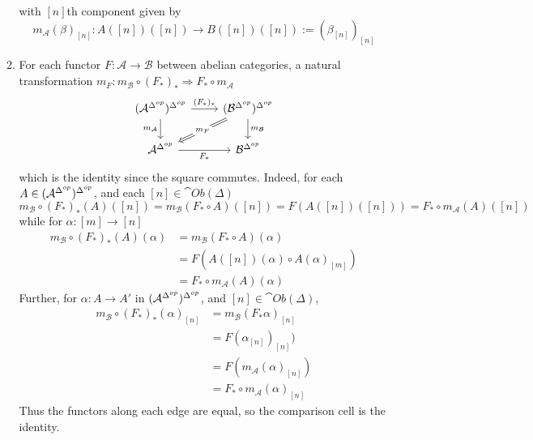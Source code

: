 \begin{enumerate}
\begin{enumerate}
\begin{equation*}
        \end{equation*}
        with $[n]$th component given by
        \begin{equation*}
            m_\mathcal{A}(\beta)_{[n]}:A([n])([n])\rightarrow B([n])([n]) := (\beta_{[n]})_{[n]}
        \end{equation*}
        \item For each functor $F:\mathcal{A}\rightarrow \mathcal{B}$ between abelian categories, a natural transformation $m_F:m_\mathcal{B}\circ (F_*)_*\Rightarrow F_*\circ m_\mathcal{A}$
        \[\begin{tikzcd}
        	{(\mathcal{A}\Sob)\Sob} & {(\mathcal{B}\Sob)\Sob} \\
        	{\mathcal{A}\Sob} & {\mathcal{B}\Sob}
        	\arrow["{(F_*)_*}", from=1-1, to=1-2]
        	\arrow["{m_\mathcal{B}}", from=1-2, to=2-2]
        	\arrow["{m_\mathcal{A}}"', from=1-1, to=2-1]
        	\arrow["{F_*}"', from=2-1, to=2-2]
        	\arrow["{m_F}"{description}, Rightarrow, from=1-2, to=2-1]
        \end{tikzcd}\]
        which is the identity since the square commutes. Indeed, for each $A \in (\mathcal{A}^{\Delta^{op}})^{\Delta^{op}}$, and each $[n] \in\cat{Ob}(\Delta)$
        \begin{equation*}
            m_\mathcal{B}\circ (F_*)_*(A)([n]) = m_\mathcal{B}(F_*\circ A)([n]) = F(A([n])([n])) = F_*\circ m_\mathcal{A}(A)([n])
        \end{equation*}
        while for $\alpha:[m]\rightarrow [n]$
        \begin{align*}
            m_\mathcal{B}\circ (F_*)_*(A)(\alpha) &= m_\mathcal{B}(F_*\circ A)(\alpha) \\
            &= F(A([n])(\alpha)\circ A(\alpha)_{[m]}) \\
            &= F_*\circ m_\mathcal{A}(A)(\alpha)
        \end{align*}
        Further, for $\alpha:A\rightarrow A'$ in $(\mathcal{A}^{\Delta^{op}})^{\Delta^{op}}$, and $[n] \in \cat{Ob}(\Delta)$,
        \begin{align*}
            m_\mathcal{B}\circ (F_*)_*(\alpha)_{[n]} &= m_\mathcal{B}(F_*\alpha)_{[n]} \\
            &= F(\alpha_{[n]})_{[n]}) \\
            &= F(m_\mathcal{A}(\alpha)_{[n]}) \\
            &= F_*\circ m_\mathcal{A}(\alpha)_{[n]}
        \end{align*}
        Thus the functors along each edge are equal, so the comparison cell is the identity.

\end{enumerate}
\end{enumerate}
